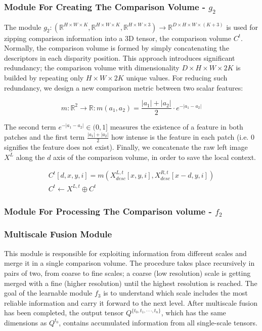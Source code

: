 \documentclass[runningheads]{llncs}
\begin{document}
\subsubsection{Module For Creating The Comparison Volume - $g_2$}

The module $g_2: (\mathbb{R}^{H \times W \times K}, \mathbb{R}^{H \times W \times K}, \mathbb{R}^{H \times W \times 3}) \rightarrow \mathbb{R}^{D \times H \times W \times (K+3)}$ is used for zipping comparison information into a 3D tensor, the comparison volume $C^t$. Normally, the comparison volume is formed by simply concatenating the descriptors in each disparity position. This approach introduces significant redundancy; the comparison volume with dimensionality $D \times H \times W \times 2K$ is builded by repeating only $H \times W \times 2K$ unique values. For reducing such redundancy, we design a new comparison metric between two scalar features:

\begin{equation} \label{eq:m}
    m: \mathbb{R}^2 \rightarrow \mathbb{R}: m(a_1, a_2) = \frac{|a_1| + |a_2|}{2} \cdot e^{-|a_1 - a_2|}    
\end{equation}


The second term $e^{-|a_1 - a_2|} \in (0,1]$ measures the existence of a feature in both patches and the first term $\frac{|a_1| + |a_2|}{2}$ how intense is the feature in each patch (i.e. $0$ signifies the feature does not exist). Finally, we concatenate the raw left image $X^L$ along the $d$ axis of the comparison volume, in order to save the local context.

\begin{gather} \label{eq:comparison_volume}
    C^t[d, x, y, i] = m( X^{L, t}_{desc}[x,y,i], X^{R, t}_{desc}[x-d,y, i]) \\
    C^t \leftarrow X^{L, t} \oplus C^t
\end{gather}

\subsubsection{Module For Processing The Comparison volume - $f_2$}


\subsubsection{Multiscale Fusion Module}

This module is responsible for exploiting information from different scales and merge it in a single comparison volume. The procedure takes place recursively in pairs of two, from coarse to fine scales; a coarse (low resolution) scale is getting merged with a fine (higher resolution) until the highest resolution is reached. The goal of the learnable module $f_3$ is to understand which scale includes the most reliable information and carry it forward to the next level. After multiscale fusion has been completed, the output tensor $Q^{\{t_0, t_1, \cdot \cdot \cdot, t_n\}}$, which has the same dimensions as $Q^{t_0}$, contains accumulated information from all single-scale tensors. 
\end{document}
